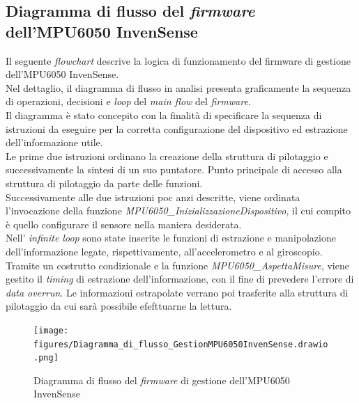 \documentclass[11pt]{report}
\begin{document}
\subsection{Diagramma di flusso del \textit{firmware} \\dell'MPU6050 InvenSense}
Il seguente \textit{flowchart} descrive la logica di funzionamento del firmware di gestione dell'MPU6050 InvenSense.\\
Nel dettaglio, il diagramma di flusso in analisi presenta graficamente la sequenza di operazioni, decisioni e \textit{loop} del \textit{main flow} del \textit{firmware}.\\
Il diagramma è stato concepito con la finalità di specificare la sequenza di istruzioni da eseguire per la corretta configurazione del dispositivo ed estrazione dell'informazione utile.\\
Le prime due istruzioni ordinano la creazione della struttura di pilotaggio e successivamente la sintesi di un suo puntatore. Punto principale di accesso alla struttura di pilotaggio da parte delle funzioni.\\
Successivamente alle due istruzioni poc anzi descritte, viene ordinata l'invocazione della  funzione \textit{MPU6050\_InizializzazioneDispositivo}, il cui compito è quello configurare il sensore nella maniera desiderata.\\
Nell' \textit{infinite loop} sono state inserite le funzioni di estrazione e manipolazione dell'informazione legate, rispettivamente, all'accelerometro e al giroscopio.
Tramite un costrutto condizionale e la funzione \textit{MPU6050\_AspettaMisure}, viene gestito il \textit{timing} di estrazione dell'informazione, con il fine di prevedere l'errore di \textit{data overrun}.
Le informazioni estrapolate verrano poi trasferite alla struttura di pilotaggio da cui sarà possibile efefttuarne la lettura.

\begin{figure}[H]
    \centering
    \texttt{[image: figures/Diagramma\_di\_flusso\_GestionMPU6050InvenSense.drawio.png]}
    \caption{Diagramma di flusso del \textit{firmware} di gestione dell'MPU6050 InvenSense}
    \label{fig:diagramma 2.1}
\end{figure}

\newpage
\end{document}
